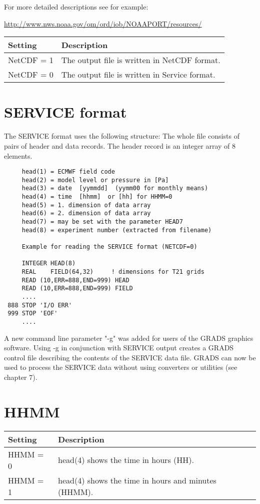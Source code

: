 For more detailed descriptions see for example:

{\url{http://www.nws.noaa.gov/om/ord/iob/NOAAPORT/resources/}}

\begin{tabular}{|l|p{10cm}|}
\hline
Setting & Description \\
\hline
   NetCDF = 1 & The output file is written in NetCDF format. \\
   NetCDF = 0 & The output file is written in Service format. \\
\hline
\end{tabular}

\section{SERVICE format}

     The SERVICE format uses the following structure:
     The whole file consists of pairs of
     header and data records.
     The header record is an integer array of 8 elements.

\begin{verbatim}
     head(1) = ECMWF field code
     head(2) = model level or pressure in [Pa]
     head(3) = date  [yymmdd]  (yymm00 for monthly means)
     head(4) = time  [hhmm]  or [hh] for HHMM=0
     head(5) = 1. dimension of data array
     head(6) = 2. dimension of data array
     head(7) = may be set with the parameter HEAD7
     head(8) = experiment number (extracted from filename)

     Example for reading the SERVICE format (NETCDF=0)

     INTEGER HEAD(8)
     REAL    FIELD(64,32)     ! dimensions for T21 grids
     READ (10,ERR=888,END=999) HEAD
     READ (10,ERR=888,END=999) FIELD
     ....
 888 STOP 'I/O ERR'
 999 STOP 'EOF'
     ....
\end{verbatim}

A new command line parameter "-g" was added for users of the GRADS
graphics software. Using -g in conjunction with SERVICE output
creates a GRADS control file describing the contents of the SERVICE
data file. GRADS can now be used to process the SERVICE data without
using converters or utilities (see chapter 7).


\section{HHMM}

\begin{tabular}{|l|p{12cm}|}
\hline
Setting & Description \\
\hline
  HHMM  =  0 & head(4) shows the time in hours (HH). \\
  HHMM  =  1 & head(4) shows the time in hours and minutes (HHMM). \\
\hline
\end{tabular}

